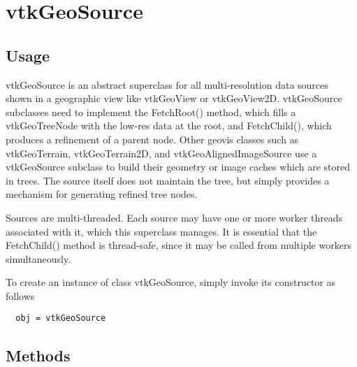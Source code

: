 \section{vtkGeoSource}

\subsection{Usage}

 vtkGeoSource is an abstract superclass for all multi-resolution data sources
 shown in a geographic view like vtkGeoView or vtkGeoView2D. vtkGeoSource
 subclasses need to implement the FetchRoot() method, which fills a
 vtkGeoTreeNode with the low-res data at the root, and FetchChild(), which
 produces a refinement of a parent node. Other geovis classes such as
 vtkGeoTerrain, vtkGeoTerrain2D, and vtkGeoAlignedImageSource use a
 vtkGeoSource subclass to build their geometry or image caches which are
 stored in trees. The source itself does not maintain the tree, but
 simply provides a mechanism for generating refined tree nodes.

 Sources are multi-threaded. Each source may have one or more worker threads
 associated with it, which this superclass manages. It is essential that the
 FetchChild() method is thread-safe, since it may be called from multiple
 workers simultaneously.

To create an instance of class vtkGeoSource, simply
invoke its constructor as follows
\begin{verbatim}
  obj = vtkGeoSource
\end{verbatim}
\subsection{Methods}

